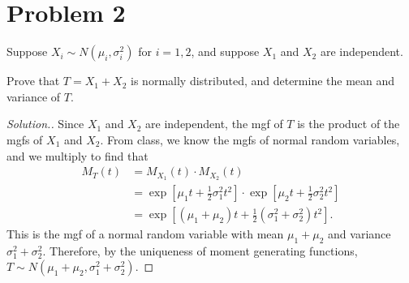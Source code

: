 \documentclass{article}
\begin{document}
\section*{Problem 2}
Suppose $X_i\sim N(\mu_i, \sigma_i^2)$ for $i = 1,2$, and suppose $X_1$ and $X_2$ are independent.\par Prove that $T = X_1 + X_2$ is normally distributed, and determine the mean and variance of $T$.

\begin{proof}[Solution.]
Since $X_1$ and $X_2$ are independent, the mgf of $T$ is the product of the mgfs of $X_1$ and $X_2$. From class, we know the mgfs of normal random variables, and we multiply to find that
\begin{align*}
M_T(t) &= M_{X_1}(t)\cdot M_{X_2}(t) \\
&= \exp\left[\mu_1 t + \frac{1}{2}\sigma_1^2t^2\right]\cdot\exp\left[\mu_2 t + \frac{1}{2}\sigma_2^2t^2\right] \\
&= \exp\left[(\mu_1 + \mu_2)t + \frac{1}{2}(\sigma_1^2 + \sigma_2^2)t^2\right].
\end{align*}
This is the mgf of a normal random variable with mean $\mu_1 + \mu_2$ and variance $\sigma_1^2 + \sigma_2^2$. Therefore, by the uniqueness of moment generating functions, $\boxed{T\sim N(\mu_1 + \mu_2, \sigma_1^2 + \sigma_2^2)}$.
\end{proof}
\end{document}
